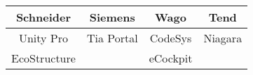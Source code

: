 \begin{tabular}{c|c|c|c}
 \textbf{Schneider} & \textbf{Siemens} & \textbf{Wago} & \textbf{Tend} \\\hline
 Unity Pro & Tia Portal & CodeSys & Niagara \\
 EcoStructure & & eCockpit & \\
\end{tabular}
